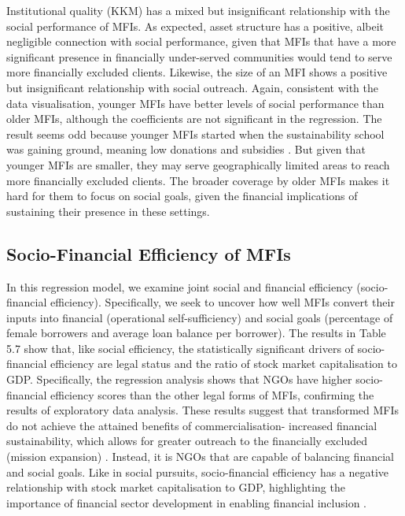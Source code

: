 \documentclass[a4paper, nobind]{templates/ociamthesis}
\begin{document}
Institutional quality (KKM) has a mixed but insignificant relationship with the social performance of MFIs. As expected, asset structure has a positive, albeit negligible connection with social performance, given that MFIs that have a more significant presence in financially under-served communities would tend to serve more financially excluded clients. Likewise, the size of an MFI shows a positive but insignificant relationship with social outreach. Again, consistent with the data visualisation, younger MFIs have better levels of social performance than older MFIs, although the coefficients are not significant in the regression. The result seems odd because younger MFIs started when the sustainability school was gaining ground, meaning low donations and subsidies \autocite{d2013unsubsidized}. But given that younger MFIs are smaller, they may serve geographically limited areas to reach more financially excluded clients. The broader coverage by older MFIs makes it hard for them to focus on social goals, given the financial implications of sustaining their presence in these settings.

\hypertarget{socio-financial-efficiency-of-mfis}{%
\subsection{Socio-Financial Efficiency of MFIs}\label{socio-financial-efficiency-of-mfis}}

In this regression model, we examine joint social and financial efficiency (socio-financial efficiency). Specifically, we seek to uncover how well MFIs convert their inputs into financial (operational self-sufficiency) and social goals (percentage of female borrowers and average loan balance per borrower). The results in Table 5.7 show that, like social efficiency, the statistically significant drivers of socio-financial efficiency are legal status and the ratio of stock market capitalisation to GDP. Specifically, the regression analysis shows that NGOs have higher socio-financial efficiency scores than the other legal forms of MFIs, confirming the results of exploratory data analysis. These results suggest that transformed MFIs do not achieve the attained benefits of commercialisation- increased financial sustainability, which allows for greater outreach to the financially excluded (mission expansion) \autocite{mersland2010microfinance}. Instead, it is NGOs that are capable of balancing financial and social goals. Like in social pursuits, socio-financial efficiency has a negative relationship with stock market capitalisation to GDP, highlighting the importance of financial sector development in enabling financial inclusion \autocite{allen2013resolving}.
\end{document}
